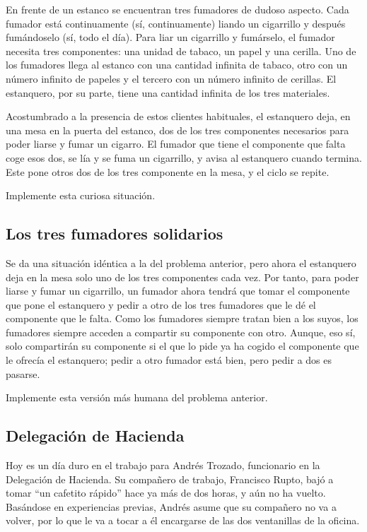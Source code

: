 \documentclass[a4paper]{article}
\begin{document}
En frente de un estanco se encuentran tres fumadores de dudoso aspecto. Cada fumador está continuamente (sí, continuamente) liando un cigarrillo y después fumándoselo (sí, todo el día). Para liar un cigarrillo y fumárselo, el fumador necesita tres componentes: una unidad de tabaco, un papel y una cerilla. Uno de los fumadores llega al estanco con una cantidad infinita de tabaco, otro con un número infinito de papeles y el tercero con un número infinito de cerillas. El estanquero, por su parte, tiene una cantidad infinita de los tres materiales.

Acostumbrado a la presencia de estos clientes habituales, el estanquero deja, en una mesa en la puerta del estanco, dos de los tres componentes necesarios para poder liarse y fumar un cigarro. El fumador que tiene el componente que falta coge esos dos, se lía y se fuma un cigarrillo, y avisa al estanquero cuando termina. Este pone otros dos de los tres componente en la mesa, y el ciclo se repite.

Implemente esta curiosa situación.

\subsection{Los tres fumadores solidarios}

Se da una situación idéntica a la del problema anterior, pero ahora el estanquero deja en la mesa solo uno de los tres componentes cada vez. Por tanto, para poder liarse y fumar un cigarrillo, un fumador ahora tendrá que tomar el componente que pone el estanquero y pedir a otro de los tres fumadores que le dé el componente que le falta. Como los fumadores siempre tratan bien a los suyos, los fumadores siempre acceden a compartir su componente con otro. Aunque, eso sí, solo compartirán su componente si el que lo pide ya ha cogido el componente que le ofrecía el estanquero; pedir a otro fumador está bien, pero pedir a dos es pasarse.

Implemente esta versión más humana del problema anterior.

\subsection{Delegación de Hacienda}

Hoy es un día duro en el trabajo para Andrés Trozado, funcionario en la Delegación de Hacienda. Su compañero de trabajo, Francisco Rupto, bajó a tomar ``un cafetito rápido'' hace ya más de dos horas, y aún no ha vuelto. Basándose en experiencias previas, Andrés asume que su compañero no va a volver, por lo que le va a tocar a él encargarse de las dos ventanillas de la oficina.
\end{document}
